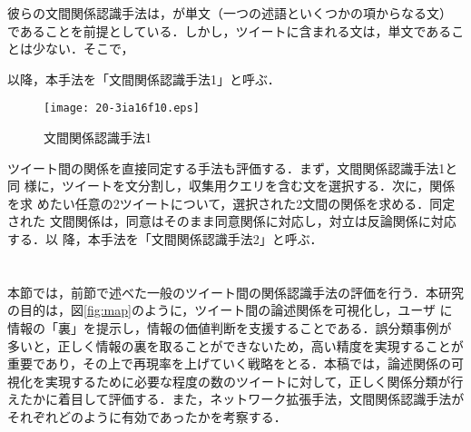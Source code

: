 \documentclass[japanese]{jnlp_1.4}
\newcommand{\addspan}[1]{}
\begin{document}
彼らの文間関係認識手法は，\addspan{仮説}が単文（一つの述語といくつかの項からなる文）
であることを前提としている．しかし，ツイートに含まれる文は，単文であるこ
とは少ない．そこで，\addspan{まず，トピックと2つのツイートの間の関係をそれぞれ同定
し，次にこれら2つの関係に基づいてツイート間の関係を同定する．このとき，
トピックが仮説に，ツイートがテキストに対応する．図 \ref{fig:rel_classification_1}に，トピックを用いてツイート間の関係を求め
る手法を示す．まず，関係を求めたい2つのツイートに対して，ツイートとトピッ
クとの間の関係を求める．その際，ツイートは，まず文分割され，次に収集用ク
エリが全て含まれる文のみが選択される．そのような文が複数存在する場合は，
一番後ろの一文を選択する．図\ref{fig:rel_classification_1}は，中心にトピッ
ク，上下にツイートから選択された文を表している．上側の文はいず
れも同意で，下側の文は，一方が同意で，他方が対立に分類されている．最後に，
求められた2つの関係から，ツイート間の関係を分類する．トピックとツイートと
の間の関係から導かれるツイート間の関係の組み合わせを，以下に示す．}
\addspan{
\begin{enumerate}
 \item 2つの関係のうち1つでも「その他」 $\Rightarrow$ 「その他」
 \item 2つの関係がいずれも「同意」 $\Rightarrow$ 「同意」
 \item 2つの関係がいずれも「対立」 $\Rightarrow$ 「同意」
 \item 2つの関係が異なる，すなわち「同意・対立」または，「対立・同意」
       $\Rightarrow$ 「反論」
\end{enumerate}
}
以降，本手法を「文間関係認識手法1」と呼ぶ．

\begin{figure}[b]
 \centering
   \texttt{[image: 20-3ia16f10.eps]}
 \caption{文間関係認識手法1}
 \label{fig:rel_classification_1}
\end{figure}

ツイート間の関係を直接同定する手法も評価する．まず，文間関係認識手法1と同
様に，ツイートを文分割し，収集用クエリを含む文を選択する．次に，関係を求
めたい任意の2ツイートについて，選択された2文間の関係を求める．同定された
文間関係は，同意はそのまま同意関係に対応し，対立は反論関係に対応する．以
降，本手法を「文間関係認識手法2」と呼ぶ．


\section{\addspan{一般的なツイート間の関係認識結果}}

本節では，前節で述べた一般のツイート間の関係認識手法の評価を行う．本研究
の目的は，図\ref{fig:map}のように，ツイート間の論述関係を可視化し，ユーザ
に情報の「裏」を提示し，情報の価値判断を支援することである．誤分類事例が
多いと，正しく情報の裏を取ることができないため，高い精度を実現することが
重要であり，その上で再現率を上げていく戦略をとる．本稿では，論述関係の可
視化を実現するために必要な程度の数のツイートに対して，正しく関係分類が行
えたかに着目して評価する．また，ネットワーク拡張手法，文間関係認識手法が
それぞれどのように有効であったかを考察する．
\end{document}
